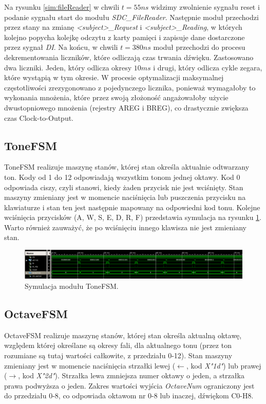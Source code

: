 \documentclass[a4paper,12pt]{article}
\begin{document}
Na rysunku \ref{sim:fileReader} w chwili $t=55ns$ widzimy zwolnienie sygnału reset i podanie sygnału start do modułu \textit{SDC\_FileReader}. Następnie moduł przechodzi przez stany na zmianę \textit{<subject>\_Request} i \textit{<subject>\_Reading}, w których kolejno popycha kolejkę odczytu z karty pamięci i zapisuje dane dostarczone przez sygnał \textit{DI}. Na końcu, w chwili $t=380ns$ moduł przechodzi do procesu dekrementowania liczników, które odliczają czas trwania dźwięku. Zastosowano dwa liczniki. Jeden, który odlicza okresy $10ms$ i drugi, który odlicza cykle zegara, które wystąpią w tym okresie. W procesie optymalizacji maksymalnej częstotliwości zrezygonowano z pojedynczego licznika, ponieważ wymagałoby to wykonania mnożenia, które przez swoją złożoność angażowałoby użycie dwustopniowego mnożenia (rejestry AREG i BREG\cite{web:datasheet}), co drastycznie zwiększa czas Clock-to-Output.



\subsection{ToneFSM}
ToneFSM realizuje maszynę stanów, której stan określa aktualnie odtwarzany ton.
Kody od 1 do 12 odpowiadają wszystkim tonom jednej oktawy. Kod 0 odpowiada ciszy, czyli stanowi, kiedy żaden przycisk nie jest wciśnięty. Stan maszyny zmieniany jest w momencie naciśnięcia lub puszczenia przycisku na klawiaturze i stan ten jest następnie mapowany na odpowiedni kod tonu. Kolejne wciśnięcia przycisków (A, W, S, E, D, R, F) przedstawia symulacja na rysunku \ref{sim:tone}. Warto również zauważyć, że po wciśnięciu innego klawisza nie jest zmieniany stan.

\begin{figure}[h]
  \centering
  \includegraphics[decodearray={1 0 1 0 1 0}, width=\linewidth]{images/tone}
  \caption{Symulacja modułu ToneFSM.}
  \label{sim:tone}
\end{figure}

\subsection{OctaveFSM}
OctaveFSM realizuje maszynę stanów, której stan określa aktualną oktawę, względem której określane są okresy fali, dla aktualnego tonu (przez ton rozumiane są tutaj wartości całkowite, z przedziału 0-12). Stan maszyny zmieniany jest w momencie naciśnięcia strzałki lewej ($\leftarrow$, kod \textit{X"1d"}) lub prawej ($\rightarrow$, kod \textit{X"2d"}). Strzałka lewa zmniejsza numer oktawy o jeden, a strzałka prawa podwyższa o jeden. Zakres wartości wyjścia \textit{OctaveNum} ograniczony jest do przedziału 0-8, co odpowiada oktawom nr 0-8 lub inaczej, dźwiękom C0-H8. 
\end{document}
